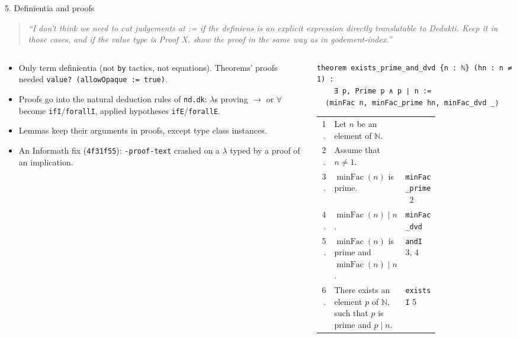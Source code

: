 \documentclass[10pt,aspectratio=169]{beamer}
\newcommand{\commit}[1]{\texttt{\footnotesize #1}}
\newcommand{\prompt}[1]{\begin{quote}\small\itshape ``#1''\end{quote}}
\begin{document}
\begin{frame}[fragile]{5. Definientia and proofs}
  \small
  \prompt{I don't think we need to cut judgements at := if the definiens is an
  explicit expression directly translatable to Dedukti. Keep it in those cases,
  and if the value type is Proof X, show the proof in the same way as in
  godement-index.}
  \begin{columns}[T]
    \begin{column}{0.5\textwidth}
      \begin{itemize}
        \item Only term definientia (not \texttt{by} tactics, not equations).
              Theorems' proofs needed \texttt{value? (allowOpaque := true)}.
        \item Proofs go into the natural deduction rules of \texttt{nd.dk}:
              $\lambda$s proving $\to$ or $\forall$ become \texttt{ifI}/\texttt{forallI},
              applied hypotheses \texttt{ifE}/\texttt{forallE}.
        \item Lemmas keep their arguments in proofs, except type class
              instances.
        \item An Informath fix (\commit{4f31f55}): \texttt{-proof-text} crashed on
              a $\lambda$ typed by a proof of an implication.
      \end{itemize}
    \end{column}
    \begin{column}{0.48\textwidth}
\begin{lstlisting}
theorem exists_prime_and_dvd {n : ℕ} (hn : n ≠ 1) :
    ∃ p, Prime p ∧ p ∣ n :=
  ⟨minFac n, minFac_prime hn, minFac_dvd _⟩
\end{lstlisting}
      \scriptsize
      \begin{tabular}{@{}r>{\raggedright\arraybackslash}p{0.6\linewidth}l@{}}
        1. & Let $n$ be an element of $\mathbb{N}$. & \\
        2. & Assume that $n \neq 1$. & \\
        3. & $\operatorname{minFac}(n)$ is prime. & \texttt{minFac\_prime}~2 \\
        4. & $\operatorname{minFac}(n) \mid n$. & \texttt{minFac\_dvd} \\
        5. & $\operatorname{minFac}(n)$ is prime and $\operatorname{minFac}(n) \mid n$. & \texttt{andI} 3, 4 \\
        6. & There exists an element $p$ of $\mathbb{N}$, such that $p$ is prime and $p \mid n$. & \texttt{existsI} 5 \\
      \end{tabular}
    \end{column}
  \end{columns}
\end{frame}
\end{document}
